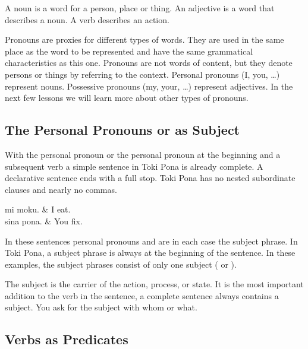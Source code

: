 A noun is a word for a person, place or thing.
An adjective is a word that describes a noun.
A verb describes an action.

Pronouns are proxies for different types of words.
They are used in the same place as the word to be represented and have the same grammatical characteristics as this one.
Pronouns are not words of content, but they denote persons or things by referring to the context.
Personal pronouns (I, you, \dots) represent nouns.
Possessive pronouns (my, your, \dots) represent adjectives.
In the next few lessons we will learn more about other types of pronouns.

\subsection*{The Personal Pronouns  or  as Subject}
With the personal pronoun  or the personal pronoun  at the beginning and a subsequent verb a simple sentence in Toki Pona is already complete.
A declarative sentence ends with a full stop.
Toki Pona has no nested subordinate clauses and nearly no commas.

\begin{translationtable}
    mi moku.   & I eat.   \\
    sina pona. & You fix. \\
\end{translationtable}
%
In these sentences personal pronouns  and  are in each case the subject phrase.
In Toki Pona, a subject phrase is always at the beginning of the sentence.
In these examples, the subject phrases consist of only one subject ( or ).

The subject is the carrier of the action, process, or state.
It is the most important addition to the verb in the sentence, a complete sentence always contains a subject.
You ask for the subject with whom or what.

\subsection*{Verbs as Predicates}

